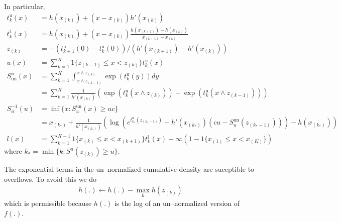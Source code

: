 \documentclass[11pt]{article}
\newcommand{\tangnt}{t^{\mathrm{u}}}
\newcommand{\linejoin}{t^{\mathrm{l}}}
\newcommand{\upperlog}{u}
\newcommand{\lowerlog}{l}
\newcommand{\normconst}{c}
\newcommand{\cumulproposal}{S}
\newcommand{\arsindex}{k}
\newcommand{\arsmaxindex}{K}
\begin{document}
In particular, 
\begin{align}
\tangnt_\arsindex(x) &=h(x_{(\arsindex)})+(x-x_{(\arsindex)})h'(x_{(\arsindex)})\\
\linejoin_\arsindex(x) &=h(x_{(\arsindex)})+(x-x_{(\arsindex)})\frac{h(x_{(\arsindex+1)})-h(x_{(\arsindex)})}{x_{(\arsindex+1)}-x_{(\arsindex)}}\\
z_{(\arsindex)}&=-(\tangnt_{\arsindex+1}(0)-\tangnt_{\arsindex}(0))/(h'(x_{(\arsindex+1)})-h'(x_{(\arsindex)}))\\
\upperlog(x)&=\sum_{\arsindex=1}^\arsmaxindex 1{\{z_{(\arsindex-1)}\leq x <z_{(\arsindex)}\}} \tangnt_{\arsindex}(x)\\
\cumulproposal^\upperlog_{\mathrm{un}}(x)&= 
\sum_{\arsindex=1}^{\arsmaxindex}\int_{x\wedge z_{(\arsindex-1)}}^{x\wedge z_{(\arsindex)}}\exp(\tangnt_\arsindex(y))dy\\
&=\sum_{\arsindex=1}^{\arsmaxindex}\frac{1}{h'(x_{(\arsindex)})}\left( \exp(\tangnt_\arsindex(x\wedge z_{(\arsindex)}))-\exp(\tangnt_\arsindex(x\wedge z_{(\arsindex-1)}))\right)\\
\cumulproposal_\upperlog^{-1}(u)&=\inf\{x:\cumulproposal^{\mathrm{un}}_\upperlog(x)\geq u \normconst\}\\\label{eq:invcumul_1}
&=x_{(\arsindex_*)}+\frac{1}{h'(x_{(\arsindex_*)})}\left(\log\left(e^{\tangnt_{\arsindex_*}(z_{(\arsindex_*-1)})}+h'(x_{(\arsindex_*)})(\normconst u-\cumulproposal^{\mathrm{un}}_\upperlog(z_{(\arsindex_*-1)}))\right)-h(x_{(\arsindex_*)})\right)\\\label{eq:invcumul_2}
\lowerlog(x)&=\sum_{\arsindex=1}^{\arsmaxindex-1}1\{x_{(\arsindex)}\leq x<x_{(\arsindex+1)}\}\linejoin_{\arsindex}(x)-\infty(1-1\{x_{(1)}\leq x<x_{(\arsmaxindex)}\})
\end{align}where $\arsindex_*=\min\{\arsindex:\cumulproposal^\upperlog(z_{(\arsindex)})\geq u\}$. %

The exponential terms in the un--normalized cumulative density are suceptible to overflows. To avoid this we do
\begin{align}
 h(.)\leftarrow h(.) - \max_{\arsindex}h(z_{(\arsindex)})
\end{align}which is permissible because $h(.)$ is the log of an un--normalized version of $f(.)$.
\end{document}
